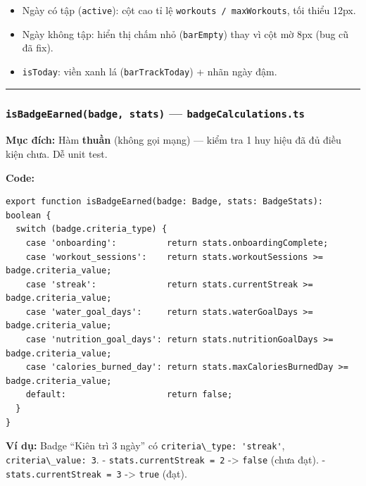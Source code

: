 \documentclass[12pt,a4paper]{article}
\providecommand{\passthrough}[1]{#1}
\providecommand{\tightlist}{%
  \setlength{\itemsep}{0pt}\setlength{\parskip}{0pt}}
\begin{document}
\begin{itemize}
\tightlist
\item
  Ngày có tập (\passthrough{\lstinline!active!}): cột cao tỉ lệ
  \passthrough{\lstinline!workouts / maxWorkouts!}, tối thiểu 12px.
\item
  Ngày không tập: hiển thị chấm nhỏ (\passthrough{\lstinline!barEmpty!})
  thay vì cột mờ 8px (bug cũ đã fix).
\item
  \passthrough{\lstinline!isToday!}: viền xanh lá
  (\passthrough{\lstinline!barTrackToday!}) + nhãn ngày đậm.
\end{itemize}

\begin{center}\rule{0.5\linewidth}{0.5pt}\end{center}

\subsubsection{\texorpdfstring{\texttt{isBadgeEarned(badge,\ stats)} ---
\texttt{badgeCalculations.ts}}{isBadgeEarned(badge, stats) --- badgeCalculations.ts}}\label{isbadgeearnedbadge-stats-badgecalculations.ts}

\textbf{Mục đích:} Hàm \textbf{thuần} (không gọi mạng) --- kiểm tra 1
huy hiệu đã đủ điều kiện chưa. Dễ unit test.

\textbf{Code:}

\begin{lstlisting}
export function isBadgeEarned(badge: Badge, stats: BadgeStats): boolean {
  switch (badge.criteria_type) {
    case 'onboarding':          return stats.onboardingComplete;
    case 'workout_sessions':    return stats.workoutSessions >= badge.criteria_value;
    case 'streak':              return stats.currentStreak >= badge.criteria_value;
    case 'water_goal_days':     return stats.waterGoalDays >= badge.criteria_value;
    case 'nutrition_goal_days': return stats.nutritionGoalDays >= badge.criteria_value;
    case 'calories_burned_day': return stats.maxCaloriesBurnedDay >= badge.criteria_value;
    default:                    return false;
  }
}

\end{lstlisting}

\textbf{Ví dụ:} Badge ``Kiên trì 3 ngày'' có
\passthrough{\lstinline!criteria\_type: 'streak'!},
\passthrough{\lstinline!criteria\_value: 3!}. -
\passthrough{\lstinline!stats.currentStreak = 2!} -\textgreater{}
\passthrough{\lstinline!false!} (chưa đạt). -
\passthrough{\lstinline!stats.currentStreak = 3!} -\textgreater{}
\passthrough{\lstinline!true!} (đạt).
\end{document}
